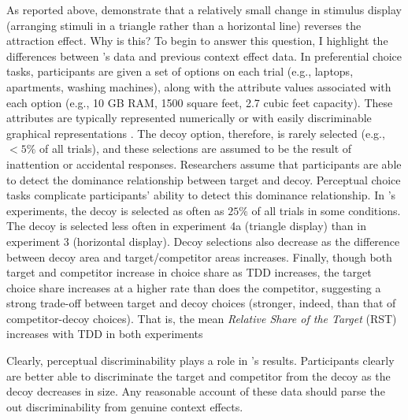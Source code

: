 As reported above, \textcite{spektorWhenGoodLooks2018b} demonstrate that a relatively small change in stimulus display (arranging stimuli in a triangle rather than a horizontal line) reverses the attraction effect. Why is this? To begin to answer this question, I highlight the differences between \textcite{spektorWhenGoodLooks2018b}'s data and previous context effect data. In preferential choice tasks, participants are given a set of options on each trial (e.g., laptops, apartments, washing machines), along with the attribute values associated with each option (e.g., 10 GB RAM, 1500 square feet, 2.7 cubic feet capacity). These attributes are typically represented numerically \parencite{hayes2024attribute,banerjeeFactorsThatPromote2024} or with easily discriminable graphical representations \parencite{cataldoComparisonProcessAccount2019b}. The decoy option, therefore, is rarely selected (e.g., $<5\%$ of all trials), and these selections are assumed to be the result of inattention or accidental responses. Researchers assume that participants are able to detect the dominance relationship between target and decoy. Perceptual choice tasks complicate participants' ability to detect this dominance relationship. In \textcite{spektorWhenGoodLooks2018b}'s experiments, the decoy is selected as often as $25\%$ of all trials in some conditions. The decoy is selected less often in experiment 4a (triangle display) than in experiment 3 (horizontal display). Decoy selections also decrease as the difference between decoy area and target/competitor areas increases. Finally, though both target and competitor increase in choice share as TDD increases, the target choice share increases at a higher rate than does the competitor, suggesting a strong trade-off between target and decoy choices (stronger, indeed, than that of competitor-decoy choices). That is, the mean \textit{Relative Share of the Target} (RST) \parencite{berkowitschRigorouslyTestingMultialternative2014b} increases with TDD in both experiments %

Clearly, perceptual discriminability plays a role in \textcite{spektorWhenGoodLooks2018b}'s results. Participants clearly are better able to discriminate the target and competitor from the decoy as the decoy decreases in size. Any reasonable account of these data should parse the out discriminability from genuine context effects. 


